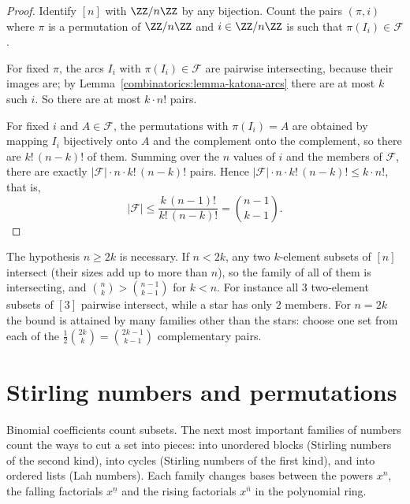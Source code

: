 \begin{proof}
Identify $[n]$ with $\ZZ/n\ZZ$ by any bijection. Count the pairs $(\pi, i)$ where $\pi$ is a permutation of $\ZZ/n\ZZ$ and $i \in \ZZ/n\ZZ$ is such that $\pi(I_i) \in \mathcal{F}$.

For fixed $\pi$, the arcs $I_i$ with $\pi(I_i) \in \mathcal{F}$ are pairwise intersecting, because their images are; by Lemma~\ref{combinatorics:lemma-katona-arcs} there are at most $k$ such $i$. So
there are at most $k \cdot n!$ pairs.

For fixed $i$ and $A \in \mathcal{F}$, the permutations with $\pi(I_i) = A$ are obtained by mapping $I_i$ bijectively onto $A$ and the complement onto the complement, so there are $k!\,(n - k)!$ of
them. Summing over the $n$ values of $i$ and the members of $\mathcal{F}$, there are exactly $|\mathcal{F}| \cdot n \cdot k!\,(n - k)!$ pairs. Hence $|\mathcal{F}| \cdot n \cdot k!\,(n - k)! \leq k \cdot n!$,
that is,
\[
|\mathcal{F}| \leq \frac{k\,(n - 1)!}{k!\,(n - k)!} = \binom{n - 1}{k - 1}.
\]
\end{proof}

\begin{counterexample}\label{combinatorics:counterexample-ekr}
The hypothesis $n \geq 2k$ is necessary. If $n < 2k$, any two $k$-element subsets of $[n]$ intersect (their sizes add up to more than $n$), so the family of all of them is intersecting, and
$\binom{n}{k} > \binom{n - 1}{k - 1}$ for $k < n$. For instance all $3$ two-element subsets of $[3]$ pairwise intersect, while a star has only $2$ members. For $n = 2k$ the bound is attained by
many families other than the stars: choose one set from each of the $\frac12\binom{2k}{k} = \binom{2k-1}{k-1}$ complementary pairs.
\end{counterexample}

\section{Stirling numbers and permutations}\label{combinatorics:section-stirling}

Binomial coefficients count subsets. The next most important families of numbers count the ways to cut a set into pieces: into unordered blocks (Stirling numbers of the second kind), into cycles
(Stirling numbers of the first kind), and into ordered lists (Lah numbers). Each family changes bases between the powers $x^n$, the falling factorials $x^{\underline{n}}$ and the rising factorials
$x^{\overline{n}}$ in the polynomial ring.

